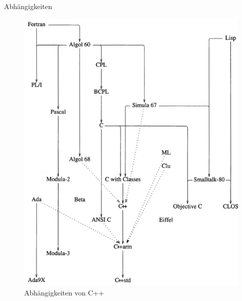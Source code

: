 \documentclass[presentation]{beamer}
\begin{document}
\begin{frame}[label={sec:org232c96f}]{Abhängigkeiten}
\begin{center}\begin{figure}[htbp]
\centering
\includegraphics[height=0.8\textheight]{data/2b/515ad4-e3c4-4834-a7be-e95147807c04/screenshot-20160217-144741.png}
\caption{Abhängigkeiten von C++}
\end{figure}\end{center}
\end{frame}
\end{document}
